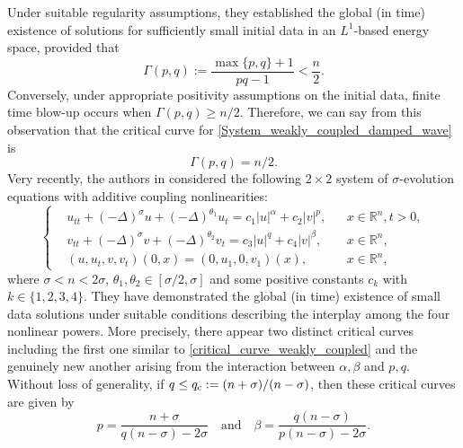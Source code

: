 \documentclass[11pt,reqno]{amsart}
\begin{document}
	Under suitable regularity assumptions, they established the global (in time) existence of solutions for sufficiently small initial data in an $L^1$-based energy space, provided that
	\[
	\Gamma(p,q):=\frac{\max\{p,q\}+1}{pq-1}<\frac{n}{2}.
	\]
	Conversely, under appropriate positivity assumptions on the initial data, finite time blow-up occurs when $\Gamma(p,q)\geq n/2$. Therefore, we can say from this observation that the critical curve for \eqref{System_weakly_coupled_damped_wave} is
	\begin{equation}
		\label{critical_curve_weakly_coupled}
		\Gamma(p,q)=n/2.
	\end{equation}
	Very recently, the authors in \cite{Dabbicco2025} considered the following $2\times 2$ system of $\sigma$-evolution equations with additive coupling nonlinearities:
	\begin{equation}\label{System_weakly_coupled_damped_sigma}
		\left\{
		\begin{aligned}
			&u_{tt}+(-\Delta)^{\sigma}u+(-\Delta)^{\theta_1}u_t= c_1|u|^{\alpha}+c_2|v|^{p},&&x\in \mathbb R^n,t>0,\\
			&v_{tt}+(-\Delta)^{\sigma}v+(-\Delta)^{\theta_2}v_t= c_3|u|^{q}+c_4|v|^{\beta},&&x\in \mathbb R^n,\\
			&(u,u_t,v,v_t)(0,x)=(0,u_1,0,v_1)(x),&&x\in \mathbb{R}^n,
		\end{aligned}
		\right.
	\end{equation}
	where $\sigma<n<2\sigma$, $\theta_1,\theta_2\in [\sigma/2,\sigma]$ and some positive constants $c_k$ with $k\in\{1,2,3,4\}$. They have demonstrated the global (in time) existence of small data solutions under suitable conditions describing the interplay among the four nonlinear powers. More precisely, there appear two distinct critical curves including the first one similar to \eqref{critical_curve_weakly_coupled} and the genuinely new another arising from the interaction between $\alpha,\beta$ and $p,q$. Without loss of generality, if $q\leq q_{\rm c}:=(n+\sigma)/(n-\sigma)$, then these critical curves are given by
	\[
	p=\frac{n+\sigma}{q(n-\sigma)-2\sigma}\quad\text{and}\quad\beta=\frac{q(n-\sigma)}{p(n-\sigma)-2\sigma}.
	\]
	
\end{document}
